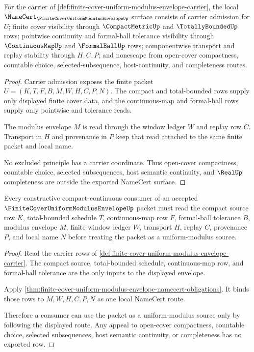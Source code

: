 \begin{theorem}
\label{thm:finite-cover-uniform-modulus-envelope-namecert-obligations}
For the carrier of \autoref{def:finite-cover-uniform-modulus-envelope-carrier}, the local $\NameCert_{\FiniteCoverUniformModulusEnvelopeUp}$ surface consists of carrier admission for $U$; finite cover visibility through $\CompactMetricUp$ and $\TotallyBoundedUp$ rows; pointwise continuity and formal-ball tolerance visibility through $\ContinuousMapUp$ and $\FormalBallUp$ rows; componentwise transport and replay stability through $H,C,P$; and nonescape from open-cover compactness, countable choice, selected-subsequence, host-continuity, and completeness routes.
\end{theorem}
\begin{proof}
Carrier admission exposes the finite packet $U=(K,T,F,B,M,W,H,C,P,N)$. The compact and total-bounded rows supply only displayed finite cover data, and the continuous-map and formal-ball rows supply only pointwise and tolerance reads.

The modulus envelope $M$ is read through the window ledger $W$ and replay row $C$. Transport in $H$ and provenance in $P$ keep that read attached to the same finite packet and local name.

No excluded principle has a carrier coordinate. Thus open-cover compactness, countable choice, selected subsequences, host semantic continuity, and $\RealUp$ completeness are outside the exported NameCert surface.
\end{proof}

\begin{theorem}
\label{thm:finite-cover-uniform-modulus-envelope-consumer-route}
Every constructive compact-continuous consumer of an accepted $\FiniteCoverUniformModulusEnvelopeUp$ packet must read the compact source row $K$, total-bounded schedule $T$, continuous-map row $F$, formal-ball tolerance $B$, modulus envelope $M$, finite window ledger $W$, transport $H$, replay $C$, provenance $P$, and local name $N$ before treating the packet as a uniform-modulus source.
\end{theorem}
\begin{proof}
Read the carrier rows of \autoref{def:finite-cover-uniform-modulus-envelope-carrier}. The compact source, total-bounded schedule, continuous-map row, and formal-ball tolerance are the only inputs to the displayed envelope.

Apply \autoref{thm:finite-cover-uniform-modulus-envelope-namecert-obligations}. It binds those rows to $M,W,H,C,P,N$ as one local NameCert route.

Therefore a consumer can use the packet as a uniform-modulus source only by following the displayed route. Any appeal to open-cover compactness, countable choice, selected subsequences, host semantic continuity, or completeness has no exported row.
\end{proof}

